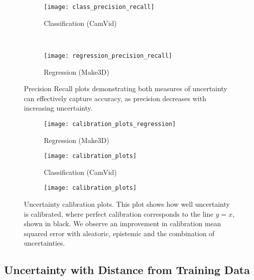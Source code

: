 \documentclass{article}
\begin{document}
\begin{figure}[t]
    \centering
    \begin{subfigure}[t]{0.4\linewidth}
        \centering
        \texttt{[image: class\_precision\_recall]}
        \caption{Classification (CamVid)}
    \end{subfigure}
    ~ 
    \begin{subfigure}[t]{0.4\linewidth}
        \centering
        \texttt{[image: regression\_precision\_recall]}
        \caption{Regression (Make3D)}
    \end{subfigure}
    \caption{
    Precision Recall plots demonstrating both measures of uncertainty can effectively capture accuracy, as precision decreases with increasing uncertainty.}
\label{fig:prec_recall}
\vspace{-3mm}
\end{figure}


\begin{figure*}[t]
\centering
    \begin{subfigure}[t]{0.33\linewidth}
        \centering
       \texttt{[image: calibration\_plots\_regression]}
        \caption{Regression (Make3D)}
    \end{subfigure}
    \begin{subfigure}[t]{0.3\linewidth}
        \centering
       \texttt{[image: calibration\_plots]}
        \caption{Classification (CamVid)}
    \end{subfigure}
    \begin{subfigure}[t]{0.32\linewidth}
        \centering
       \texttt{[image: calibration\_plots]}
\end{subfigure}
\caption{Uncertainty calibration plots. This plot shows how well uncertainty is calibrated, where perfect calibration corresponds to the line $y=x$, shown in black. We observe an improvement in calibration mean squared error with aleatoric, epistemic and the combination of uncertainties.}
\label{fig:calibrationplot}
\vspace{-3mm}
\end{figure*}



\subsection{Uncertainty with Distance from Training Data}
\end{document}
